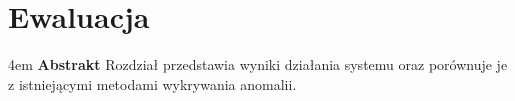 \chapter{Ewaluacja}

\begingroup
\leftskip4em
\rightskip\leftskip
\noindent
\textbf{Abstrakt} Rozdział przedstawia wyniki działania systemu oraz porównuje je z istniejącymi metodami wykrywania anomalii.
\par
\endgroup


